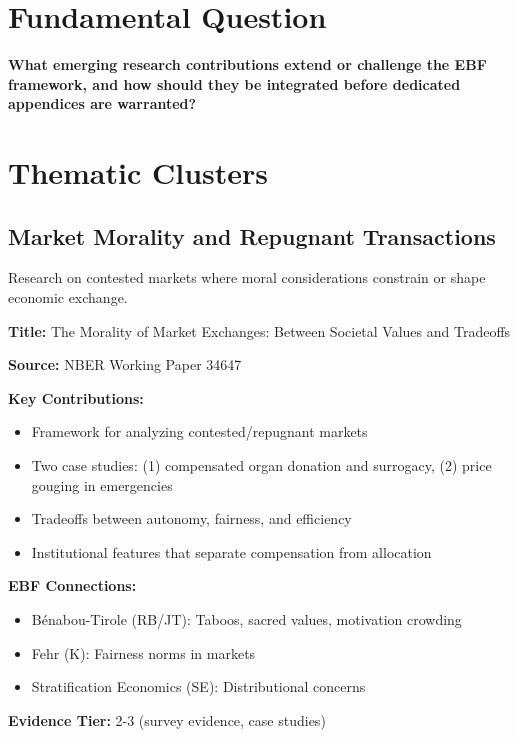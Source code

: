 \section{Fundamental Question}
\label{sec:ot-fundamental}

\begin{tcolorbox}[colback=red!5!white,colframe=red!75!black,title=Fundamental Question]
\textbf{What emerging research contributions extend or challenge the EBF framework, and how should they be integrated before dedicated appendices are warranted?}
\end{tcolorbox}

\section{Thematic Clusters}
\label{sec:ot-clusters}

\subsection{Market Morality and Repugnant Transactions}
\label{subsec:ot-repugnant}

Research on contested markets where moral considerations constrain or shape economic exchange.

\begin{tcolorbox}[colback=yellow!5!white,colframe=yellow!75!black,title=Key Paper: Elias, Lacetera \& Macis (2026)]
\textbf{Title:} The Morality of Market Exchanges: Between Societal Values and Tradeoffs

\textbf{Source:} NBER Working Paper 34647

\textbf{Key Contributions:}
\begin{itemize}
    \item Framework for analyzing contested/repugnant markets
    \item Two case studies: (1) compensated organ donation and surrogacy, (2) price gouging in emergencies
    \item Tradeoffs between autonomy, fairness, and efficiency
    \item Institutional features that separate compensation from allocation
\end{itemize}

\textbf{EBF Connections:}
\begin{itemize}
    \item Bénabou-Tirole (RB/JT): Taboos, sacred values, motivation crowding
    \item Fehr (K): Fairness norms in markets
    \item Stratification Economics (SE): Distributional concerns
\end{itemize}

\textbf{Evidence Tier:} 2-3 (survey evidence, case studies)
\end{tcolorbox}

